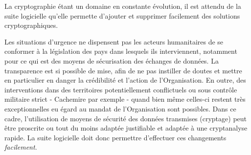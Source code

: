 La cryptographie étant un domaine en constante évolution, il est attendu de la suite logicielle qu'elle permette d'ajouter et supprimer facilement des solutions cryptographiques. 
\begin{constraint}
	Les situations d'urgence ne dispensent pas les acteurs humanitaires de se conformer à la législation des pays dans lesquels ils interviennent, notamment pour ce qui est des moyens de sécurisation des échanges de données.
	La transparence est si possible de mise, afin de ne pas instiller de doutes et mettre en particulier en danger la crédibilité et l'action de l'Organisation.
	En outre, des interventions dans des territoires potentiellement conflictuels ou sous contrôle militaire strict - Cachemire par exemple - quand bien même celles-ci restent très exceptionnelles eu égard au mandat de l'Organisation sont possibles.
	Dans ce cadre, l'utilisation de moyens de sécurité des données transmises (cryptage) peut être proscrite ou tout du moins adaptée justifiable et adaptée à une cryptanalyse \og{}rapide\fg{}.
	La suite logicielle doit donc permettre d'effectuer ces changements \emph{facilement}.
\end{constraint}

